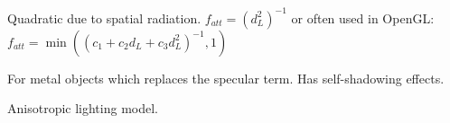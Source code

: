 \begin{definition}[Attenuation]
  Quadratic due to spatial radiation. \(f_{att} = (d_L^2)^{-1}\) or often used in OpenGL:
  \(f_{att} = \min((c_1 + c_2d_L + c_3d_L^2)^{-1}, 1)\)
\end{definition}

\begin{definition}
  For metal objects which replaces the specular term. Has self-shadowing effects.
\end{definition}

\begin{definition}[Ashikhmin]
  Anisotropic lighting model.
\end{definition}
